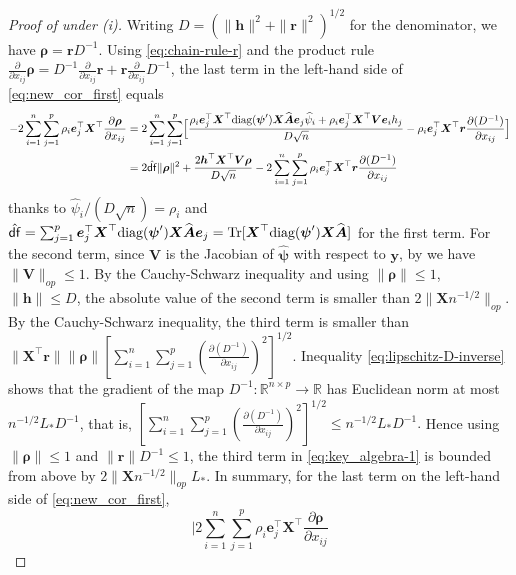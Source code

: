 \documentclass[11pt]{amsart}
\numberwithin{equation}{section}
\numberwithin{equation}{section}
\def\real{{\mathbb{R}}}
\def\R{{\real}}
\def\diag{\hbox{\rm diag}}
\DeclareMathOperator{\trace}{Tr}
\def\mathbold{\boldsymbol} %
\def\bA{\mathbold{A}}\def\calA{{\cal A}}\def\scrA{{\mathscr A}}\def\Ahat{\widehat{A}}\def\Atil{{\widetilde A}}
\def\hbA{{\widehat{\bA}}}\def\tbA{{\widetilde{\bA}}}
\def\bh{\mathbold{h}}\def\hhat{\widehat{h}}\def\htil{\widetilde{h}}
\def\br{\mathbold{r}}\def\rhat{\widehat{r}}\def\rtil{\widetilde{r}}\def\rbar{{\overline r}}\def\brbar{{\overline \br}}
\def\be{\mathbold{e}}
\def\bV{\mathbold{V}}\def\hbV{{\widehat{\bV}}}\def\tbV{{\widetilde{\bV}}}
\def\bX{\mathbold{X}}\def\hbX{{\widehat{\bX}}}\def\tbX{{\widetilde{\bX}}}\def\bXbar{{\overline \bX}}
\def\by{\mathbold{y}}\def\yhat{\widehat{y}}\def\ytil{\widetilde{y}}\def\ybar{{\overline y}}\def\vby{{\bf y}}
\def\brho{\mathbold{\rho}}\def\rhohat{\widehat{\rho}}\def\hrho{\widehat{\rho}}
\def\bpsi{\mathbold{\psi}}\def\psihat{\widehat{\psi}}\def\hpsi{\widehat{\psi}}
\def\hbpsi{{\widehat{\bpsi}}}\def\tbpsi{{\widetilde{\bpsi}}}
\def\df{{\hat{\mathsf{df}}}{}}
\begin{document}
{\begin{proof}[Proof of  under (i)]
    Writing $D=(\|\bh\|^2+\|\br\|^2)^{1/2}$ for the denominator,
    we have $\brho = \br D^{-1}$.
    Using \eqref{eq:chain-rule-r} and the product rule
    $\frac{\partial}{\partial x_{ij}}\brho
    =D^{-1}\frac{\partial}{\partial x_{ij}}\br
    +
    \br \frac{\partial}{\partial x_{ij}} D^{-1}
    $,
    the last term in the left-hand side
    of \eqref{eq:new_cor_first} equals
    \begin{align}
    - 2\sum_{i=1}^n\sum_{j=1}^p
    \rho_i\be_j^\top\bX^\top\frac{\partial \brho}{\partial x_{ij}}
    &=
    2\sum_{i=1}^n\sum_{j=1}^p
    \Bigl[
    \frac{
        \rho_i \be_j^\top\bX^\top\diag(\bpsi')\bX\hbA\be_j \hpsi_i
        +
        \rho_i \be_j^\top\bX^\top\bV \be_i h_j
        }{D \sqrt n}
    -
    \rho_i\be_j^\top\bX^\top \br \frac{\partial(D^{-1})}{\partial x_{ij}}
    \Bigr]
    \nonumber
    \\&=
    2\df \|\brho\|^2
    +
    \frac{2 \bh^\top\bX^\top\bV\brho}{D\sqrt n}   
    -
    2\sum_{i=1}^n\sum_{j=1}^p
    \rho_i\be_j^\top\bX^\top \br \frac{\partial(D^{-1})}{\partial x_{ij}}
    \label{eq:key_algebra-1}
    \end{align}
    thanks to $\hpsi_i /(D\sqrt n) = \rho_i$ and
    $\df=\sum_{j=1}^p \be_j^\top\bX^\top\diag(\bpsi')\bX\hbA\be_j
    = \trace[\bX^\top\diag(\bpsi')\bX\hbA]$ for the first term.
    For the second term,
    since $\bV$ is the Jacobian of $\hbpsi$ with respect to $\by$,
    by  we have $\|\bV\|_{op} \le 1$.
    By the Cauchy-Schwarz inequality and using $\|\brho\|\le 1$,
    $\|\bh\|\le D$, the 
    absolute value of the second term is smaller
    than
    $2\|\bX n^{-1/2}\|_{op}$.
    By the Cauchy-Schwarz inequality, 
    the third term is smaller than
    $\|\bX^\top\br\|\|\brho\|
    [\sum_{i=1}^n\sum_{j=1}^p
    (\frac{\partial(D^{-1})}{\partial x_{ij}})^2
    ]^{1/2}$.
    Inequality \eqref{eq:lipschitz-D-inverse} shows that the gradient
    of the map $D^{-1}:\R^{n\times p}\to \R$ has Euclidean norm at most 
    $n^{-1/2}L_* D^{-1}$, that is,
    $[\sum_{i=1}^n\sum_{j=1}^p(\frac{\partial(D^{-1})}{\partial x_{ij}})^2
    ]^{1/2}
    \le
    n^{-1/2} L_* D^{-1}.$
    Hence using $\|\brho\|\le 1$ and $\|\br\|D^{-1}\le 1$, the third term
    in \eqref{eq:key_algebra-1} is bounded from above by
    $2\|\bX n^{-1/2}\|_{op} L_*$.
    In summary,
    for the last term on the left-hand side of \eqref{eq:new_cor_first},
    \begin{equation}
    \Big|
    2\sum_{i=1}^n\sum_{j=1}^p
    \rho_i\be_j^\top\bX^\top\frac{\partial \brho}{\partial x_{ij}}

\end{equation}
\end{proof}}
\end{document}

